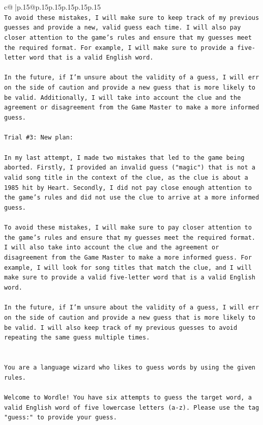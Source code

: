 \documentclass{article}
\begin{document}
{\begin{supertabular}{c@{$\;$}|p{.15\linewidth}@{}p{.15\linewidth}p{.15\linewidth}p{.15\linewidth}p{.15\linewidth}p{.15\linewidth}}
{{{\\ 
\texttt{To avoid these mistakes, I will make sure to keep track of my previous guesses and provide a new, valid guess each time. I will also pay closer attention to the game's rules and ensure that my guesses meet the required format. For example, I will make sure to provide a five{-}letter word that is a valid English word. } \\
\\ 
\texttt{In the future, if I'm unsure about the validity of a guess, I will err on the side of caution and provide a new guess that is more likely to be valid. Additionally, I will take into account the clue and the agreement or disagreement from the Game Master to make a more informed guess.} \\
\\ 
\texttt{Trial \#3: New plan: } \\
\\ 
\texttt{In my last attempt, I made two mistakes that led to the game being aborted. Firstly, I provided an invalid guess ("magic") that is not a valid song title in the context of the clue, as the clue is about a 1985 hit by Heart. Secondly, I did not pay close enough attention to the game's rules and did not use the clue to arrive at a more informed guess.} \\
\\ 
\texttt{To avoid these mistakes, I will make sure to pay closer attention to the game's rules and ensure that my guesses meet the required format. I will also take into account the clue and the agreement or disagreement from the Game Master to make a more informed guess. For example, I will look for song titles that match the clue, and I will make sure to provide a valid five{-}letter word that is a valid English word. } \\
\\ 
\texttt{In the future, if I'm unsure about the validity of a guess, I will err on the side of caution and provide a new guess that is more likely to be valid. I will also keep track of my previous guesses to avoid repeating the same guess multiple times.} \\
\\ 
\\ 
\texttt{You are a language wizard who likes to guess words by using the given rules.} \\
\\ 
\texttt{Welcome to Wordle! You have six attempts to guess the target word, a valid English word of five lowercase letters (a{-}z). Please use the tag "guess:" to provide your guess.} \\
}}}
\end{supertabular}}
\end{document}
